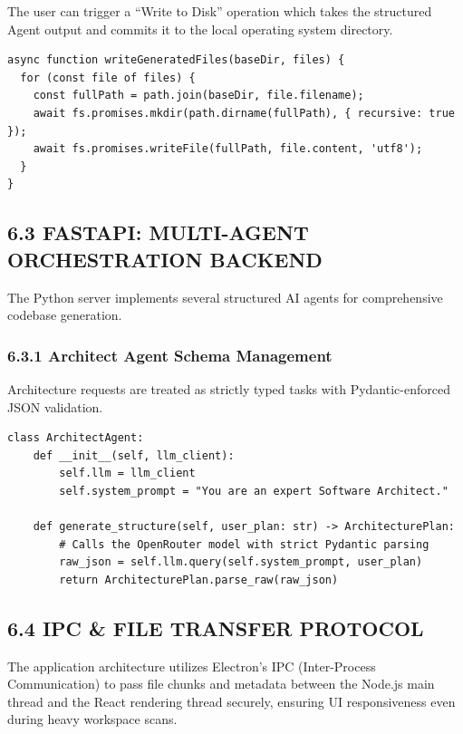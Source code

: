 \documentclass[
  12pt,
]{article}
\begin{document}
The user can trigger a ``Write to Disk'' operation which takes the
structured Agent output and commits it to the local operating system
directory.

\begin{verbatim}
async function writeGeneratedFiles(baseDir, files) {
  for (const file of files) {
    const fullPath = path.join(baseDir, file.filename);
    await fs.promises.mkdir(path.dirname(fullPath), { recursive: true });
    await fs.promises.writeFile(fullPath, file.content, 'utf8');
  }
}
\end{verbatim}

\subsection{6.3 FASTAPI: MULTI-AGENT ORCHESTRATION
BACKEND}\label{fastapi-multi-agent-orchestration-backend}

The Python server implements several structured AI agents for
comprehensive codebase generation.

\subsubsection{6.3.1 Architect Agent Schema
Management}\label{architect-agent-schema-management}

Architecture requests are treated as strictly typed tasks with
Pydantic-enforced JSON validation.

\begin{verbatim}
class ArchitectAgent:
    def __init__(self, llm_client):
        self.llm = llm_client
        self.system_prompt = "You are an expert Software Architect."
        
    def generate_structure(self, user_plan: str) -> ArchitecturePlan:
        # Calls the OpenRouter model with strict Pydantic parsing
        raw_json = self.llm.query(self.system_prompt, user_plan)
        return ArchitecturePlan.parse_raw(raw_json)
\end{verbatim}

\subsection{6.4 IPC \& FILE TRANSFER
PROTOCOL}\label{ipc-file-transfer-protocol}

The application architecture utilizes Electron's IPC (Inter-Process
Communication) to pass file chunks and metadata between the Node.js main
thread and the React rendering thread securely, ensuring UI
responsiveness even during heavy workspace scans.
\end{document}
